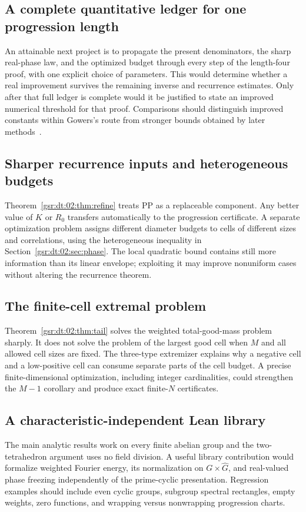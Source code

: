 \documentclass[11pt,letterpaper]{article}
\numberwithin{equation}{section}
\theoremstyle{definition}
\theoremstyle{remark}
\newcommand{\1}{\mathbf 1}
\begin{document}
\subsection{A complete quantitative ledger for one progression length}
An attainable next project is to propagate the present denominators, the sharp real-phase law, and the optimized budget through every step of the length-four proof, with one explicit choice of parameters. This would determine whether a real improvement survives the remaining inverse and recurrence estimates. Only after that full ledger is complete would it be justified to state an improved numerical threshold for that proof. Comparisons should distinguish improved constants within Gowers's route from stronger bounds obtained by later methods~\cite{greentaoUthree,lssbounds}.

\subsection{Sharper recurrence inputs and heterogeneous budgets}
Theorem~\ref{gsr:dt:02:thm:refine} treats $\mathrm{PP}$ as a replaceable component. Any better value of $K$ or $R_0$ transfers automatically to the progression certificate. A separate optimization problem assigns different diameter budgets to cells of different sizes and correlations, using the heterogeneous inequality in Section~\ref{gsr:dt:02:sec:phase}. The local quadratic bound contains still more information than its linear envelope; exploiting it may improve nonuniform cases without altering the recurrence theorem.

\subsection{The finite-cell extremal problem}
Theorem~\ref{gsr:dt:02:thm:tail} solves the weighted total-good-mass problem sharply. It does not solve the problem of the largest good cell when $M$ and all allowed cell sizes are fixed. The three-type extremizer explains why a negative cell and a low-positive cell can consume separate parts of the cell budget. A precise finite-dimensional optimization, including integer cardinalities, could strengthen the $M-1$ corollary and produce exact finite-$N$ certificates.

\subsection{A characteristic-independent Lean library}
The main analytic results work on every finite abelian group and the two-tetrahedron argument uses no field division. A useful library contribution would formalize weighted Fourier energy, its normalization on $G\times\widehat G$, and real-valued phase freezing independently of the prime-cyclic presentation. Regression examples should include even cyclic groups, subgroup spectral rectangles, empty weights, zero functions, and wrapping versus nonwrapping progression charts.
\end{document}
